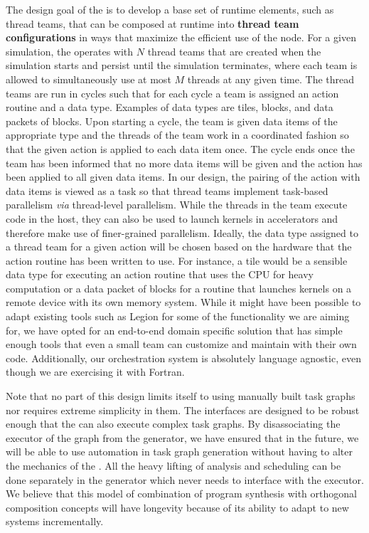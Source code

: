 The design goal of the {\OR} is to develop a base set of runtime
elements, such as thread teams, that can be composed at runtime into
\textbf{thread team configurations} in ways that maximize the
efficient use of the node. For a given simulation, the {\OR} operates
with $N$ thread teams that are created when the simulation starts and
persist until the simulation terminates, where each team is allowed to
simultaneously use at most $M$ threads at any given time. The thread
teams are run in cycles such that for each cycle a team is assigned an
action routine and a data type. Examples of data types are tiles,
blocks, and data packets of blocks. Upon starting a cycle, the team is
given data items of the appropriate type and the threads of the team
work in a coordinated fashion so that the given action is applied to
each data item once. The cycle ends once the team has been informed
that no more data items will be given and the action has been applied
to all given data items. In our design, the pairing of the action with
data items is viewed as a task so that thread teams implement
task-based  parallelism \textit{via} thread-level parallelism.
While the threads in the team execute code in the host, they can also
be used to launch kernels in accelerators and therefore make use of
finer-grained parallelism.  Ideally, the data type assigned to a
thread team for a given action will be chosen based on the hardware
that the action routine has been written to use. For instance, a tile
would be a sensible data type for executing an action routine that
uses the CPU for heavy computation or a data packet of blocks for a
routine that launches kernels on a remote device with its own memory
system. While it might have been possible to adapt existing tools such
as Legion \cite{legion} for some of the functionality we are aiming
for, we have opted for an end-to-end domain specific solution that has
simple enough tools that even a small team can customize and maintain
with their own code. Additionally, our orchestration system is
absolutely language agnostic, even though we are exercising it with
Fortran. 

Note that no part of this design limits itself to using manually built
task graphs nor requires extreme simplicity in them. The interfaces
are designed to be robust enough that the {\OR} can also execute
complex task graphs. By disassociating the executor of the graph from
the generator, we have ensured that in the future, we will be able to
use automation in task graph generation without having to alter the
mechanics of the \OR. All the heavy lifting of analysis and scheduling
can be done separately in the generator which never needs to interface
with the executor. We believe that this model of combination of
program synthesis with orthogonal composition concepts will have
longevity because of its ability to adapt to new systems
incrementally. 



